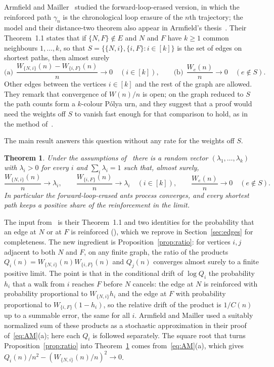 \documentclass[11pt]{amsart}
\newtheorem{theorem}{Theorem}[section]
\theoremstyle{remark}
\begin{document}
Armfield and Mailler~\cite{AM} studied the forward-loop-erased version, in which the reinforced path $\gamma_n$ is the
chronological loop erasure of the $n$th trajectory; the model and their distance-two theorem also appear in Armfield's
thesis~\cite[Chapter~2]{Arm26}. Their Theorem~1.1 states that if $\{N,F\}\notin E$ and $N$ and $F$
have $k\ge1$ common neighbours $1,\dots,k$, so that $S=\{\{N,i\},\{i,F\}:i\in[k]\}$ is the set of edges on shortest
paths, then almost surely
\begin{equation}\label{eq:AM}
\text{(a)}\ \ \frac{W_{\{N,i\}}(n)-W_{\{i,F\}}(n)}{n}\to0\quad(i\in[k]),\qquad
\text{(b)}\ \ \frac{W_e(n)}{n}\to0\quad(e\notin S).
\end{equation}
Other edges between the vertices $i\in[k]$ and the rest of the graph are allowed. They remark that convergence of
$W(n)/n$ is open; on the graph reduced to $S$ the path counts form a $k$-colour P\'olya urn, and they suggest that a
proof would need the weights off $S$ to vanish fast enough for that comparison to hold, as in the method
of~\cite{KMS22a}.

The main result answers this question without any rate for the weights off $S$.

\begin{theorem}\label{thm:main}
Under the assumptions of~\cite[Theorem~1.1]{AM} there is a random vector $(\lambda_1,\dots,\lambda_k)$ with
$\lambda_i>0$ for every $i$ and $\sum_i\lambda_i=1$ such that, almost surely,
\[
\frac{W_{\{N,i\}}(n)}{n}\to\lambda_i,\qquad \frac{W_{\{i,F\}}(n)}{n}\to\lambda_i\quad(i\in[k]),\qquad
\frac{W_e(n)}{n}\to0\quad(e\notin S).
\]
In particular the forward-loop-erased ants process converges, and every shortest path keeps a positive share of the
reinforcement in the limit.
\end{theorem}

The input from~\cite{AM} is their Theorem~1.1 and two identities for the probability that an edge at $N$ or at $F$ is
reinforced (\cite[Lemmas~2.12 and~2.13]{AM}), which we reprove in Section~\ref{sec:edges} for completeness. The new
ingredient is Proposition~\ref{prop:ratio}: for vertices $i,j$ adjacent to both $N$ and $F$, on any finite graph, the
ratio of the products $Q_i(n)=W_{\{N,i\}}(n)W_{\{i,F\}}(n)$ and $Q_j(n)$ converges almost surely to a finite positive
limit. The point is that in the conditional drift of $\log Q_i$ the probability $h_i$ that a walk from $i$ reaches $F$
before $N$ cancels: the edge at $N$ is reinforced with probability proportional to $W_{\{N,i\}}h_i$ and the edge at $F$
with probability proportional to $W_{\{i,F\}}(1-h_i)$, so the relative drift of the product is $1/C(n)$ up to a
summable error, the same for all $i$. Armfield and Mailler used a suitably normalized sum of these products as a
stochastic approximation in their proof of~\eqref{eq:AM}(a); here each $Q_i$ is followed separately. The square root
that turns Proposition~\ref{prop:ratio} into Theorem~\ref{thm:main} comes from~\eqref{eq:AM}(a), which gives
$Q_i(n)/n^2-(W_{\{N,i\}}(n)/n)^2\to0$.
\end{document}
